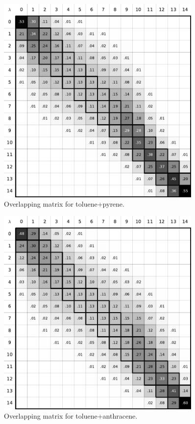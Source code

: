 \documentclass[
	12pt,				%
	openright,			%
	oneside,			%
	a4paper,			%
	english,			%
	brazil				%
	]{abntex2}
\begin{document}
\begin{apendicesenv}
\begin{figure}[H]
	\centering
	\includegraphics[width=0.9\textwidth]{Figures/otol_pyr}
	\caption{Overlapping matrix for toluene+pyrene.}
\end{figure}

\begin{figure}[H]
	\centering
	\includegraphics[width=0.9\textwidth]{Figures/otol_antr}
	\caption{Overlapping matrix for toluene+anthracene.}
\end{figure}


\end{apendicesenv}
\end{document}
